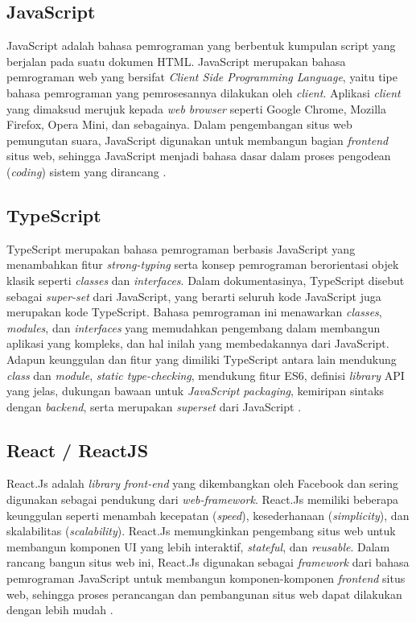 \subsection{JavaScript}
JavaScript adalah bahasa pemrograman yang berbentuk kumpulan script yang berjalan pada suatu dokumen HTML. JavaScript merupakan bahasa pemrograman web yang bersifat \textit{Client Side Programming Language}, yaitu tipe bahasa pemrograman yang pemrosesannya dilakukan oleh \textit{client}. Aplikasi \textit{client} yang dimaksud merujuk kepada \textit{web browser} seperti Google Chrome, Mozilla Firefox, Opera Mini, dan sebagainya. Dalam pengembangan situs web pemungutan suara, JavaScript digunakan untuk membangun bagian \textit{frontend} situs web, sehingga JavaScript menjadi bahasa dasar dalam proses pengodean (\textit{coding}) sistem yang dirancang \cite{Pramadipta2024}.

\subsection{TypeScript}
TypeScript merupakan bahasa pemrograman berbasis JavaScript yang menambahkan fitur \textit{strong-typing} serta konsep pemrograman berorientasi objek klasik seperti \textit{classes} dan \textit{interfaces}. Dalam dokumentasinya, TypeScript disebut sebagai \textit{super-set} dari JavaScript, yang berarti seluruh kode JavaScript juga merupakan kode TypeScript. Bahasa pemrograman ini menawarkan \textit{classes}, \textit{modules}, dan \textit{interfaces} yang memudahkan pengembang dalam membangun aplikasi yang kompleks, dan hal inilah yang membedakannya dari JavaScript. Adapun keunggulan dan fitur yang dimiliki TypeScript antara lain mendukung \textit{class} dan \textit{module}, \textit{static type-checking}, mendukung fitur ES6, definisi \textit{library} API yang jelas, dukungan bawaan untuk \textit{JavaScript packaging}, kemiripan sintaks dengan \textit{backend}, serta merupakan \textit{superset} dari JavaScript \cite{Permana2022}.

\subsection{React / ReactJS}
React.Js adalah \textit{library front-end} yang dikembangkan oleh Facebook dan sering digunakan sebagai pendukung dari \textit{web-framework}. React.Js memiliki beberapa keunggulan seperti menambah kecepatan (\textit{speed}), kesederhanaan (\textit{simplicity}), dan skalabilitas (\textit{scalability}). React.Js memungkinkan pengembang situs web untuk membangun komponen UI yang lebih interaktif, \textit{stateful}, dan \textit{reusable}. Dalam rancang bangun situs web ini, React.Js digunakan sebagai \textit{framework} dari bahasa pemrograman JavaScript untuk membangun komponen-komponen \textit{frontend} situs web, sehingga proses perancangan dan pembangunan situs web dapat dilakukan dengan lebih mudah \cite{Pramadipta2024}.


